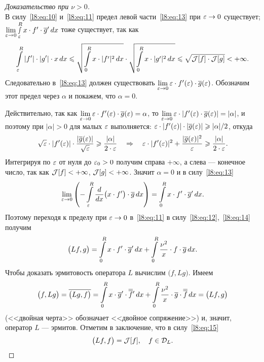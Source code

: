 \begin{proof}[Доказательство при $\nu>0$]
\begin{equation}
	\end{equation}
	В силу~\eqref{l8:eq:10} и~\eqref{l8:eq:11} предел левой части~\eqref{l8:eq:13} при $\varepsilon\to0$ существует; $\lim\limits_{\varepsilon\to0}\smallint\limits_{\varepsilon}^R x\cdot f'\cdot\overline{g}'\,dx$ тоже существует, так как 
	\begin{equation*}
		\hfill\int\limits_{\eps}^{R}|f'|\cdot|g'|\cdot x\,dx\leqslant\sqrt{\int\limits_{0}^{R}x\cdot|f'|^2\,dx}\cdot\sqrt{\int\limits_{0}^{R}x\cdot|g'|^2\,dx}\leqslant\sqrt{\J[f]\cdot\J[g]}<+\infty.\hfill
	\end{equation*}
	Следовательно в~\eqref{l8:eq:13} должен существовать $\lim\limits_{\varepsilon\to0}\varepsilon\cdot f'(\varepsilon)\cdot\overline{g}(\varepsilon)$. Обозначим этот предел через $\alpha$ и покажем, что $\alpha=0$.
	
	Действительно, так как $\lim\limits_{\varepsilon\to0}\varepsilon\cdot f'(\varepsilon)\cdot\overline{g}(\varepsilon)=\alpha$, то $\lim\limits_{\varepsilon\to0}\varepsilon\cdot |f'(\varepsilon)\cdot\overline{g}(\varepsilon)|=|\alpha|$, и поэтому при $|\alpha|>0$ для малых $\varepsilon$ выполняется: $\varepsilon\cdot|f'(\varepsilon)|\cdot|\overline{g}(\varepsilon)|\geqslant|\alpha|/2$, откуда 
	\begin{equation*}
		\hfill\sqrt{\eps}\cdot|f'(\eps)|\cdot\frac{|\overline{g}(\eps)|}{\sqrt{\eps}}\geqslant\frac{|\alpha|}{2\cdot\eps}\quad\Rightarrow\quad\eps\cdot|f'(\eps)|^2+\frac{|\overline{g}(\eps)|^2}{\eps}\geqslant\frac{|\alpha|}{2\cdot\eps}.\hfill
	\end{equation*}
	Интегрируя по $\varepsilon$ от нуля до $\varepsilon_0>0$ получим справа $+\infty$, а слева --- конечное число, так как $\mathcal{J}[f]<+\infty$, $\mathcal{J}[g]<+\infty$. Значит $\alpha=0$ и в силу~\eqref{l8:eq:13} 
	\begin{equation}\label{l8:eq:14}
		\hfill\lim\limits_{\eps\to0}\left(-\int\limits_{\eps}^R\der{}{x}\big(x\cdot f'\big)\cdot\overline{g}\,dx\right)=\int\limits_{0}^{R}x\cdot f'\cdot\overline{g}'\,dx.\hfill
	\end{equation}
	Поэтому переходя к пределу при $\varepsilon\to0$ в~\eqref{l8:eq:11} в силу~\eqref{l8:eq:12},~\eqref{l8:eq:14} получим
	\begin{equation}\label{l8:eq:15}
		\hfill\big(Lf,g\big)=\int\limits_0^R x\cdot f'\cdot\overline{g}'\,dx+\int\limits_{0}^{R}\frac{\nu^2}{x}\cdot f\cdot\overline{g}\,dx.\hfill
	\end{equation}
	Чтобы доказать эрмитовость оператора $L$ вычислим $\big(f,Lg\big)$. Имеем
	\begin{equation*}
		\hfill\big(f,Lg\big)=\overline{\big(Lg,f\big)}=\int\limits_0^R x\cdot \overline{g}'\cdot\overline{\overline{f}}\vphantom{f}'\,dx+\int\limits_{0}^{R}\frac{\nu^2}{x}\cdot \overline{g}\cdot\overline{\overline{f}}\,dx=\big(Lf,g\big)\hfill
	\end{equation*}
	(<<двойная черта>> обозначает <<двойное сопряжение>>) и, значит, оператор $L$ --- эрмитов. Отметим в заключение, что в силу~\eqref{l8:eq:15} 
	\begin{equation*}
		\hfill\big(Lf,f\big)=\J[f],\quad f\in\mc{D}_L.\hfill
	\end{equation*} 
\end{proof}

